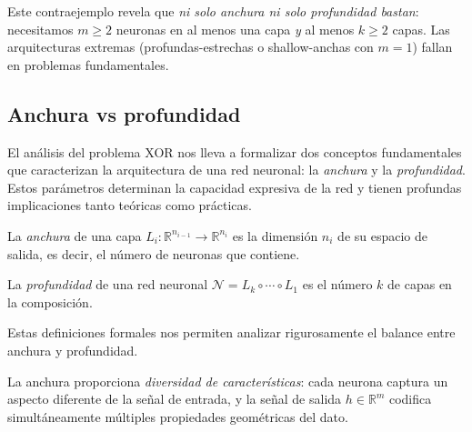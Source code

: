 Este contraejemplo revela que \textit{ni solo anchura ni solo profundidad bastan}: necesitamos $m \geq 2$ neuronas en al menos una capa \textit{y} al menos $k \geq 2$ capas. Las arquitecturas extremas (profundas-estrechas o shallow-anchas con $m=1$) fallan en problemas fundamentales.


\subsection{Anchura vs profundidad}\label{subsec:anchura_profundidad}

El análisis del problema XOR nos lleva a formalizar dos conceptos fundamentales que caracterizan la arquitectura de una red neuronal: la \textit{anchura} y la \textit{profundidad}. Estos parámetros determinan la capacidad expresiva de la red y tienen profundas implicaciones tanto teóricas como prácticas.

\begin{definition}\label{def:anchura}
La \textit{anchura} de una capa $L_i: \mathbb{R}^{n_{i-1}} \to \mathbb{R}^{n_i}$ es la dimensión $n_i$ de su espacio de salida, es decir, el número de neuronas que contiene.
\end{definition}

\begin{definition}\label{def:profundidad}
La \textit{profundidad} de una red neuronal $\mathcal{N} = L_k \circ \cdots \circ L_1$ es el número $k$ de capas en la composición.
\end{definition}

Estas definiciones formales nos permiten analizar rigurosamente el balance entre anchura y profundidad.

La anchura proporciona \textit{diversidad de características}: cada neurona captura un aspecto diferente de la señal de entrada, y la señal de salida $h \in \mathbb{R}^m$ codifica simultáneamente múltiples propiedades geométricas del dato.


